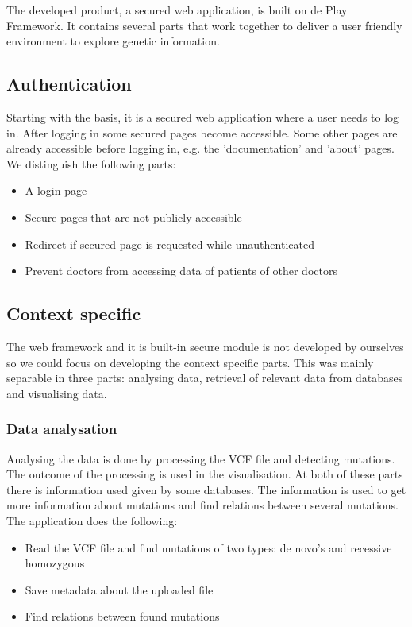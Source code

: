 The developed product, a secured web application, is built on de Play Framework. It contains several parts that work together to deliver a user friendly environment to explore genetic information.

\subsection{Authentication}

Starting with the basis, it is a secured web application where a user needs to log in. After logging in some secured pages become accessible. Some other pages are already accessible before logging in, e.g. the 'documentation' and 'about' pages. We distinguish the following parts:

\begin{itemize}
  \item A login page
  \item Secure pages that are not publicly accessible
  \item Redirect if secured page is requested while unauthenticated
  \item Prevent doctors from accessing data of patients of other doctors
\end{itemize}

\subsection{Context specific}

The web framework and it is built-in secure module is not developed by ourselves so we could focus on developing the context specific parts. This was mainly separable in three parts: analysing data, retrieval of relevant data from databases and visualising data.

\subsubsection{Data analysation}

Analysing the data is done by processing the VCF file and detecting mutations. The outcome of the processing is used in the visualisation. At both of these parts there is information used given by some databases. The information is used to get more information about mutations and find relations between several mutations. The application does the following:

\begin{itemize}
  \item Read the VCF file and find mutations of two types: de novo's and recessive homozygous
  \item Save metadata about the uploaded file
  \item Find relations between found mutations
\end{itemize}

